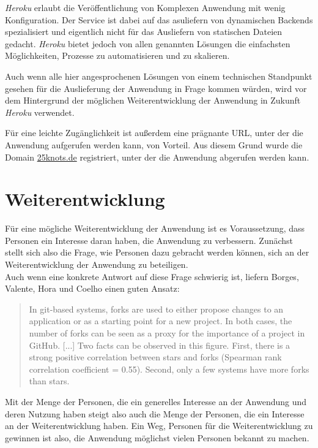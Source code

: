 \textit{Heroku} erlaubt die Veröffentlichung von Komplexen Anwendung mit wenig Konfiguration. Der Service ist dabei auf das asuliefern von dynamischen Backends spezialisiert und eigentlich nicht für das Ausliefern von statischen Dateien gedacht. \textit{Heroku} bietet jedoch von allen genannten Lösungen die einfachsten Möglichkeiten, Prozesse zu automatisieren und zu skalieren.

Auch wenn alle hier angesprochenen Lösungen von einem technischen Standpunkt gesehen für die Auslieferung der Anwendung in Frage kommen würden, wird vor dem Hintergrund der möglichen Weiterentwicklung der Anwendung in Zukunft \textit{Heroku} verwendet.

Für eine leichte Zugänglichkeit ist außerdem eine prägnante URL, unter der die Anwendung aufgerufen werden kann, von Vorteil. Aus diesem Grund wurde die Domain \url{25knots.de} registriert, unter der die Anwendung abgerufen werden kann.

\section{Weiterentwicklung}
Für eine mögliche Weiterentwicklung der Anwendung ist es Voraussetzung, dass Personen ein Interesse daran haben, die Anwendung zu verbessern. Zunächst stellt sich also die Frage, wie Personen dazu gebracht werden können, sich an der Weiterentwicklung der Anwendung zu beteiligen.\\
Auch wenn eine konkrete Antwort auf diese Frage schwierig ist, liefern Borges, Valente, Hora und Coelho einen guten Ansatz:

\begin{quote}
  In git-based systems, forks are used to either propose changes to an application or as
a starting point for a new project. In both cases, the number of forks can be seen as a proxy
for the importance of a project in GitHub. [...] Two facts can be observed in this figure. First, there is a strong positive
correlation between stars and forks (Spearman rank correlation coefficient = 0.55). Second,
only a few systems have more forks than stars. \cite{borges2015popularity}
\end{quote}

Mit der Menge der Personen, die ein generelles Interesse an der Anwendung und deren Nutzung haben steigt also auch die Menge der Personen, die ein Interesse an der Weiterentwicklung haben. Ein Weg, Personen für die Weiterentwicklung zu gewinnen ist also, die Anwendung möglichst vielen Personen bekannt zu machen.

